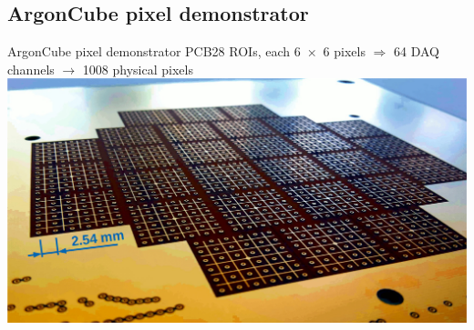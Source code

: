 \documentclass[]{beamer}
\newcommand*{\emphcoltitle}{blue}
\newcommand*{\AC}{{ArgonCube}}
\begin{document}
\subsection{\AC{} pixel demonstrator}

\begin{frame}{\AC{} pixel demonstrator PCB}{\num{28} ROIs, each \num{6 x 6} pixels $\Rightarrow$ {\color{\emphcoltitle} \num{64} DAQ channels $\rightarrow$ \num{1008} physical pixels}}
	\centering
	\includegraphics[width=\textwidth]{viper/pixies}
\end{frame}
\end{document}
